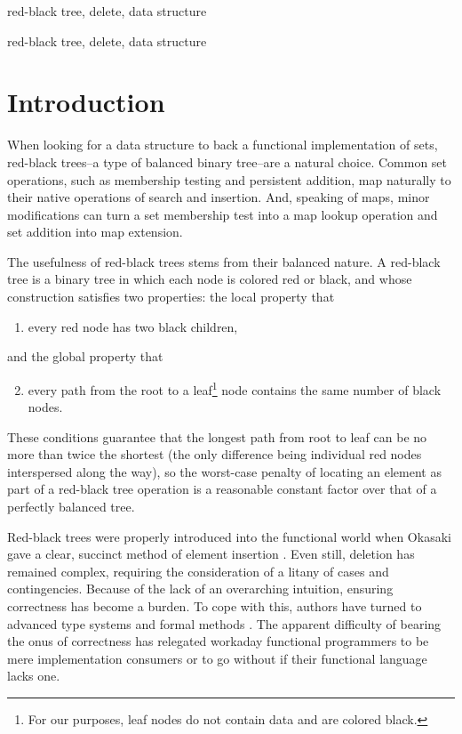 \documentclass[preprint]{sigplanconf}
\begin{document}

\terms
red-black tree, delete, data structure

\keywords
red-black tree, delete, data structure

\section{Introduction}

When looking for a data structure to back a functional implementation of sets,
red-black trees--a type of balanced binary tree--are a natural choice. Common
set operations, such as membership testing and persistent addition, map
naturally to their native operations of search and insertion. And, speaking of
maps, minor modifications can turn a set membership test into a map lookup
operation and set addition into map extension.

The usefulness of red-black trees stems from their balanced nature. A red-black
tree is a binary tree in which each node is colored red or black, and whose
construction satisfies two properties: the local property that
\begin{enumerate}
\item every red node has two black children,
\end{enumerate}
and the global property that
\begin{enumerate}
\setcounter{enumi}{1}
\item every path from the root to a leaf\footnote{For our purposes, leaf nodes
do not contain data and are colored black.} node contains the same number of
black nodes.
\end{enumerate}
These conditions guarantee that the longest path from root to leaf can be no
more than twice the shortest (the only difference being individual red nodes
interspersed along the way), so the worst-case penalty of locating an element as
part of a red-black tree operation is a reasonable constant factor over that of
a perfectly balanced tree.

Red-black trees were properly introduced into the functional world when Okasaki
gave a clear, succinct method of element insertion \cite{okasaki1999functional}.
Even still, deletion has remained complex, requiring the consideration of a
litany of cases and contingencies. Because of the lack of an overarching
intuition, ensuring correctness has become a burden. To cope with this, authors
have turned to advanced type systems \cite{kahrs2001red} and formal methods
\cite{appel2011efficient}. The apparent difficulty of bearing the onus of
correctness has relegated workaday functional programmers to be mere
implementation consumers or to go without if their functional language lacks
one.
\end{document}
